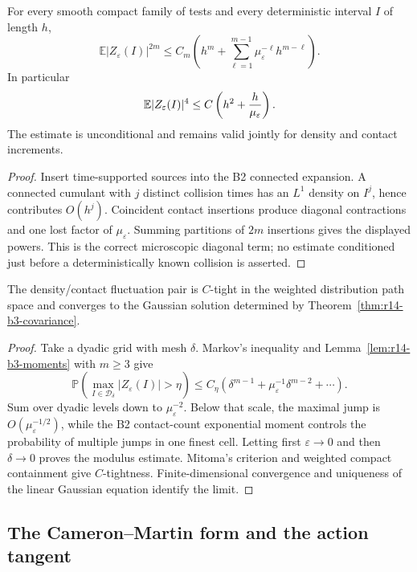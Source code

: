 \begin{lemma}
\label{lem:r14-b3-moments}
For every smooth compact family of tests and every deterministic interval
\(I\) of length \(h\),
\[
 \mathbb E|Z_\varepsilon(I)|^{2m}
 \le C_m\left(h^m+
 \sum_{\ell=1}^{m-1}\mu_\varepsilon^{-\ell}h^{m-\ell}\right).
\]
In particular
\[
 \mathbb E|Z_\varepsilon(I)|^4
 \le C\left(h^2+{h\over\mu_\varepsilon}\right).
\]
The estimate is unconditional and remains valid jointly for density and
contact increments.
\end{lemma}

\begin{proof}
Insert time-supported sources into the B2 connected expansion.  A connected
cumulant with \(j\) distinct collision times has an \(L^1\) density on
\(I^j\), hence contributes \(O(h^j)\).  Coincident contact insertions produce
diagonal contractions and one lost factor of \(\mu_\varepsilon\).  Summing
partitions of \(2m\) insertions gives the displayed powers.  This is the
correct microscopic diagonal term; no estimate conditioned just before a
deterministically known collision is asserted.
\end{proof}

\begin{theorem}
\label{thm:r14-b3-process}
The density/contact fluctuation pair is \(C\)-tight in the weighted
distribution path space and converges to the Gaussian solution determined by
Theorem~\ref{thm:r14-b3-covariance}.
\end{theorem}

\begin{proof}
Take a dyadic grid with mesh \(\delta\).  Markov's inequality and
Lemma~\ref{lem:r14-b3-moments} with \(m\ge3\) give
\[
 \mathbb P\left(
 \max_{I\in\mathcal D_\delta}|Z_\varepsilon(I)|>\eta
 \right)
 \le C_\eta(\delta^{m-1}+\mu_\varepsilon^{-1}\delta^{m-2}+\cdots).
\]
Sum over dyadic levels down to \(\mu_\varepsilon^{-2}\).  Below that scale,
the maximal jump is \(O(\mu_\varepsilon^{-1/2})\), while the B2 contact-count
exponential moment controls the probability of multiple jumps in one finest
cell.  Letting first \(\varepsilon\to0\) and then \(\delta\to0\) proves
the modulus estimate.  Mitoma's criterion and weighted compact containment
give \(C\)-tightness.  Finite-dimensional convergence and uniqueness of the
linear Gaussian equation identify the limit.
\end{proof}

\subsection{The Cameron--Martin form and the action tangent}

